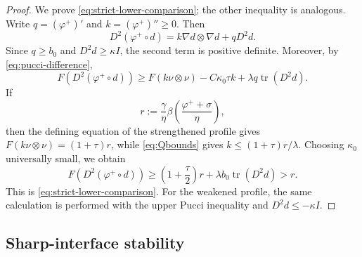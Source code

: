 \documentclass[11pt,letterpaper]{amsart}
\numberwithin{equation}{section}
\DeclareMathOperator{\tr}{tr}
\theoremstyle{definition}
\theoremstyle{remark}
\begin{document}
\begin{proof}
We prove \eqref{eq:strict-lower-comparison}; the other inequality is
analogous. Write $q=(\varphi^+)'$ and $k=(\varphi^+)''\geq0$. Then
$$
D^2(\varphi^+\circ d)
=
k\nabla d\otimes\nabla d
+
qD^2d.
$$
Since $q\geq b_0$ and $D^2d\geq\kappa I$, the second term is positive
definite. Moreover, by \eqref{eq:pucci-difference},
$$
F(D^2(\varphi^+\circ d))
\geq
F(k\nu\otimes\nu)
-
C\kappa_0\tau k
+
\lambda q\tr(D^2d).
$$
If
$$
r
:=
\frac{\gamma}{\eta}
\beta\left(\frac{\varphi^++\sigma}{\eta}\right),
$$
then the defining equation of the strengthened profile gives
$F(k\nu\otimes\nu)=(1+\tau)r$, while
\eqref{eq:Qbounds} gives $k\leq(1+\tau)r/\lambda$. Choosing
$\kappa_0$ universally small, we obtain
$$
F(D^2(\varphi^+\circ d))
\geq
\left(1+\frac\tau2\right)r
+
\lambda b_0\tr(D^2d)
>
r.
$$
This is \eqref{eq:strict-lower-comparison}. For the weakened profile, the
same calculation is performed with the upper Pucci inequality and
$D^2d\leq-\kappa I$.
\end{proof}

\subsection{Sharp-interface stability}

\end{document}
